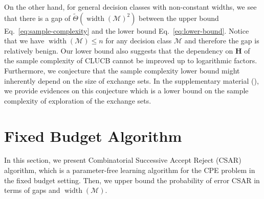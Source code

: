 \documentclass{article}
\newcommand{\Algorithm}{{\small \textsf{CLUCB}}\xspace}
\newcommand{\AlgorithmBud}{{\small \textsf{CSAR}}\xspace}
\newcommand{\Problem}{{CPE}\xspace}
\newcommand{\M}{\mathcal M}
\DeclareMathOperator{\rank}{width}
\newcommand{\Match}{\textsc{Match}\xspace}
\newcommand{\Path}{\textsc{Path}\xspace}
\begin{document}
On the other hand, for general decision classes with non-constant widths, we see that there is a gap of $\tilde \Theta(\rank(\M)^2)$ between the upper bound Eq.~\eqref{eq:sample-complexity} and the lower bound Eq.~\eqref{eq:lower-bound}.
Notice that we have $\rank(\M) \le n$ for any decision class $\M$ and therefore the gap is relatively benign.
Our lower bound also suggests that the dependency on $\mathbf H$ of the sample complexity of \Algorithm cannot be improved up to logarithmic factors.
Furthermore, we conjecture that the sample complexity lower bound might inherently depend on the size of exchange sets. 
In the supplementary material (), we provide evidences on this conjecture which is a lower bound on the sample complexity of exploration of the exchange sets.

\vspace{-0.8em}
\section{Fixed Budget Algorithm}
\vspace{-0.8em}
In this section, we present Combinatorial Successive Accept Reject (\AlgorithmBud) algorithm, which is a parameter-free learning algorithm for the \Problem problem in the fixed budget setting.
Then, we upper bound the probability of error \AlgorithmBud in terms of gaps and $\rank(\M)$.
\end{document}
